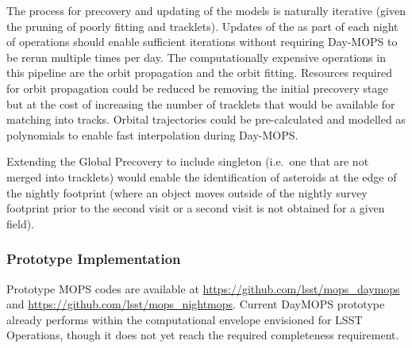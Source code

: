 The process for precovery and updating of the \SSObject models is naturally iterative (given the pruning of poorly fitting \DIAObjects and tracklets). Updates of the \SSObjects as part of each night of operations should enable sufficient iterations without requiring Day-MOPS to be rerun multiple times per day. The computationally expensive operations in this pipeline are the orbit propagation and the orbit fitting. Resources required for orbit propagation could be reduced be removing the initial precovery stage but at the cost of increasing the number of tracklets that would be available for matching into tracks. Orbital trajectories could be pre-calculated and modelled as polynomials to enable fast interpolation during Day-MOPS.



Extending the Global Precovery to include singleton \DIASources (i.e.\ one that are not merged into tracklets) would enable the identification of asteroids at the edge of the nightly footprint (where an object moves outside of the nightly survey footprint prior to the second visit or a second visit is not obtained for a given field).

\subsubsection{Prototype Implementation}

Prototype MOPS codes are available at \url{https://github.com/lsst/mops_daymops} and \url{https://github.com/lsst/mops_nightmops}. Current DayMOPS prototype already performs within the computational envelope envisioned for LSST Operations, though it does not yet reach the required completeness requirement.


